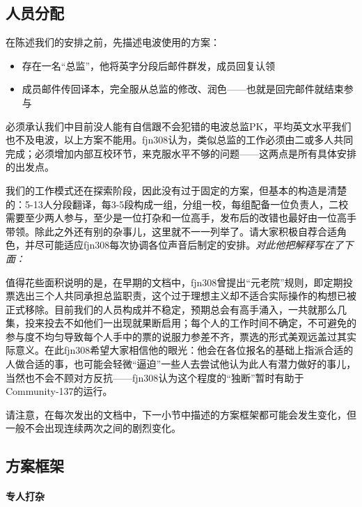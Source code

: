 \documentclass{ctexart}
\begin{document}
\subsection{人员分配}

\em\small

在陈述我们的安排之前，先描述电波使用的方案：

\begin{itemize}
    \item 存在一名“总监”，他将英字分段后邮件群发，成员回复认领
    \item 成员邮件传回译本，完全服从总监的修改、润色——也就是回完邮件就结束参与
\end{itemize}

必须承认我们中目前没人能有自信跟不会犯错的电波总监PK，平均英文水平我们也不及电波，以上方案不能用。fjn308认为，类似总监的工作必须由二或多人共同完成；必须增加内部互校环节，来克服水平不够的问题——这两点是所有具体安排的出发点。

\em\normalsize

我们的工作模式还在探索阶段，因此没有过于固定的方案，但基本的构造是清楚的：5-13人分段翻译，每3-5段构成一组，分组一校，每组配备一位负责人，二校需要至少两人参与，至少是一位打杂和一位高手，发布后的改错也最好由一位高手带领。除此之外还有别的杂事儿，这里就不一一列举了。请大家积极自荐合适角色，并尽可能适应fjn308每次协调各位声音后制定的安排。\emph{\small 对此他把解释写在了下面：}

\em\small

值得花些面积说明的是，在早期的文档中，fjn308曾提出“元老院”规则，即定期投票选出三个人共同承担总监职责，这个过于理想主义却不适合实际操作的构想已被正式移除。目前我们的人员构成并不稳定，预期总会有高手涌入，一共就那么几集，投来投去不如他们一出现就果断启用；每个人的工作时间不确定，不可避免的参与度不均匀导致每个人手中的票的说服力参差不齐，票选的形式美观远盖过其实际意义。在此fjn308希望大家相信他的眼光：他会在各位报名的基础上指派合适的人做合适的事，也可能会轻微“逼迫”一些人去尝试他认为此人有潜力做好的事儿，当然也不会不顾对方反抗——fjn308认为这个程度的“独断”暂时有助于Community-137的运行。

\em\normalsize

请注意，在每次发出的文档中，下一小节中描述的方案框架都可能会发生变化，但一般不会出现连续两次之间的剧烈变化。

\subsection{方案框架}

\paragraph{专人打杂}
\end{document}
